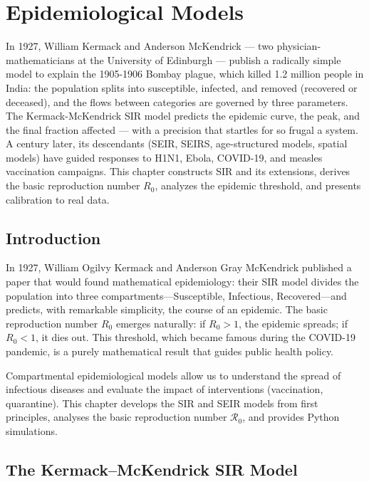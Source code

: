 \chapter{Epidemiological Models}
\label{ch:epidemiology}

In 1927, William Kermack and Anderson McKendrick --- two physician-mathematicians at the University of Edinburgh --- publish a radically simple model to explain the 1905-1906 Bombay plague, which killed 1.2 million people in India: the population splits into susceptible, infected, and removed (recovered or deceased), and the flows between categories are governed by three parameters. The Kermack-McKendrick SIR model predicts the epidemic curve, the peak, and the final fraction affected --- with a precision that startles for so frugal a system. A century later, its descendants (SEIR, SEIRS, age-structured models, spatial models) have guided responses to H1N1, Ebola, COVID-19, and measles vaccination campaigns. This chapter constructs SIR and its extensions, derives the basic reproduction number $R_0$, analyzes the epidemic threshold, and presents calibration to real data.

\section{Introduction}

In 1927, William Ogilvy Kermack and Anderson Gray McKendrick published a paper that would found mathematical epidemiology: their SIR model divides the population into three compartments---Susceptible, Infectious, Recovered---and predicts, with remarkable simplicity, the course of an epidemic. The basic reproduction number $R_0$ emerges naturally: if $R_0 > 1$, the epidemic spreads; if $R_0 < 1$, it dies out. This threshold, which became famous during the COVID-19 pandemic, is a purely mathematical result that guides public health policy.

Compartmental epidemiological models allow us to understand the spread
of infectious diseases and evaluate the impact of interventions
(vaccination, quarantine).  This chapter develops the SIR and SEIR
models from first principles, analyses the basic reproduction number
$\mathcal{R}_0$, and provides Python simulations.

\section{The Kermack--McKendrick SIR Model}
\label{sec:sir}

